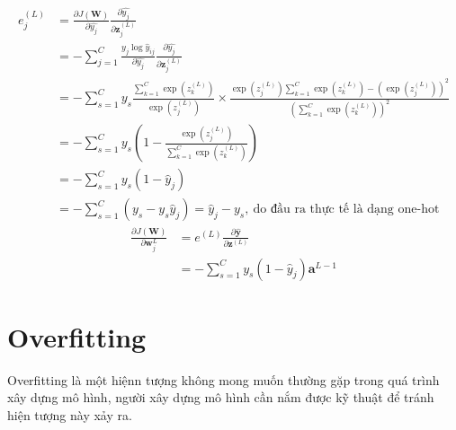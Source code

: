 \begin{equation}
\begin{split}
e_j^{(L)} &= \frac{\partial J(\textbf{W}) }{\partial \widehat{y_j}} \frac{\partial  \widehat{y_j}}{\partial \textbf{z}_j^{(L)}} \\
&=-\sum_{j=1}^C \frac{ y_{j} \log \widehat{y}_{ij}}{ \partial  \widehat{y_j}} \frac{\partial  \widehat{y_j}}{\partial \textbf{z}_j^{(L)}} \\
& = -\sum^{C}_{s=1}y_{s}\frac{\sum^C_{k=1}\exp{(z^{(L)}_k)}}{\exp{(z^{(L)}_j)}} \times \frac{\exp(z^{(L)}_j) \sum^C_{k=1}\exp(z^{(L)}_k) - (\exp(z^{(L)}_{j}))^2}{\left(\sum^C_{k=1}\exp(z^{(L)}_k)\right)^2}\\
&= -\sum^{C}_{s=1}y_{s}\left(1-\frac{\exp(z^{(L)}_j)}{\sum^C_{k=1}\exp(z^{(L)}_k)}\right)\\
& = -\sum^{C}_{s=1}y_{s} \left( 1-\widehat{y}_j \right)\\
& =  -\sum^{C}_{s=1} ( y_{s} - y_{s}\widehat{y}_j) = \widehat{y}_j - y_{s},~\text{do đầu ra thực tế là dạng one-hot}
\end{split}
\end{equation}
\begin{equation*}
\begin{split}
\frac{\partial J(\textbf{W})}{\partial \textbf{w}^{L}_j} 
&=e^{(L)}\frac{\partial  \widehat{\textbf{y}}}{\partial \textbf{z}^{(L)}}\\
&=-\sum^{C}_{s=1}y_{s} \left( 1-\widehat{y}_j \right) \textbf{a}^{L-1}
\end{split}
\end{equation*}
\section{Overfitting}
Overfitting là một hiệnn tượng không mong muốn thường gặp trong quá trình xây dựng mô hình, người xây dựng mô hình cần nắm được kỹ thuật để tránh hiện tượng này xảy ra.
